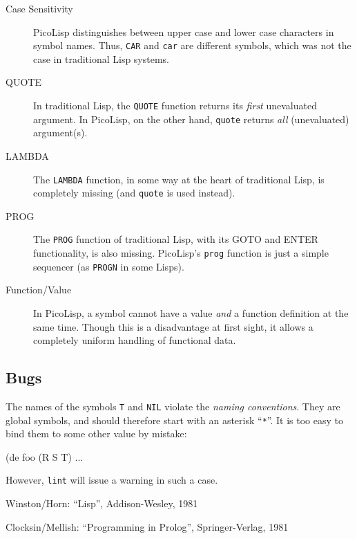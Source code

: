 \begin{description}

\item[Case Sensitivity] PicoLisp distinguishes between upper case and
  lower case characters in symbol names. Thus, \texttt{CAR} and
  \texttt{car} are different symbols, which was not the case in
  traditional Lisp systems.

\item[QUOTE] In traditional Lisp, the \texttt{QUOTE} function
  returns its \emph{first} unevaluated argument. In PicoLisp, on the
  other hand, \texttt{quote} returns \emph{all} (unevaluated)
  argument(s).

\item[LAMBDA] The \texttt{LAMBDA} function, in some way at
  the heart of traditional Lisp, is completely missing (and
  \texttt{quote} is used instead).

\item[PROG] The \texttt{PROG} function of traditional Lisp,
  with its GOTO and ENTER functionality, is also missing. PicoLisp's
  \texttt{prog} function is just a simple sequencer (as \texttt{PROGN}
  in some Lisps).

\item[Function/Value] In PicoLisp, a symbol cannot have a value
  \emph{and} a function definition at the same time. Though this is a
  disadvantage at first sight, it allows a completely uniform handling
  of functional data.

\end{description} 

\subsection{Bugs}
\label{sec:refm-bugs}


The names of the symbols \texttt{T} and \texttt{NIL} violate the \emph{naming conventions}. They are global symbols, and should therefore start with
an asterisk ``\texttt{*}''. It is too easy to bind them to some other value by
mistake:


\begin{wideverbatim}
(de foo (R S T)
   ...
\end{wideverbatim}

However, \texttt{lint} will issue a warning in such a case.

\begin{thebibliography}{[9]}

 Winston/Horn: ``Lisp'', Addison-Wesley, 1981

 Clocksin/Mellish: ``Programming in Prolog'',
  Springer-Verlag, 1981

\end{thebibliography}
